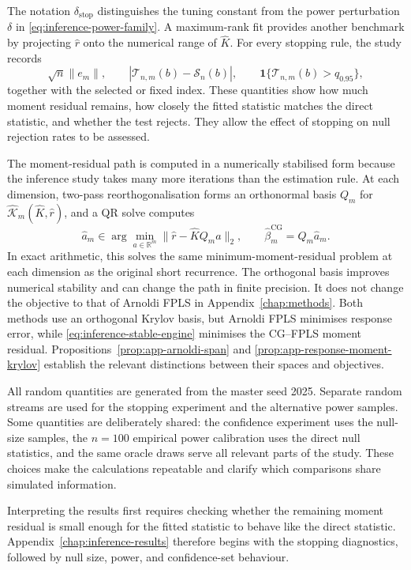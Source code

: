 The notation $\delta_{\mathrm{stop}}$ distinguishes the tuning constant from
the power perturbation $\delta$ in \eqref{eq:inference-power-family}.  A
maximum-rank fit provides another benchmark by projecting $\widehat r$ onto
the numerical range of $\widehat K$.  For every stopping rule, the study
records
\begin{equation}
    \sqrt n\|e_m\|,
    \qquad
    |\mathcal T_{n,m}(b)-\mathcal S_n(b)|,
    \qquad
    \mathbf 1\{\mathcal T_{n,m}(b)>q_{0.95}\},
    \label{eq:inference-stopping-diagnostics}
\end{equation}
together with the selected or fixed index.  These quantities show how much
moment residual remains, how closely the fitted statistic matches the direct
statistic, and whether the test rejects.  They allow the effect of stopping
on null rejection rates to be assessed.

The moment-residual path is computed in a numerically stabilised form because
the inference study takes many more iterations than the estimation rule.
At each dimension, two-pass reorthogonalisation forms an orthonormal basis
$Q_m$ for $\widehat{\mathcal K}_m(\widehat K,\widehat r)$, and a QR solve
computes
\begin{equation}
    \widehat a_m
    \in\arg\min_{a\in\mathbb R^m}
       \|\widehat r-\widehat KQ_ma\|_2,
    \qquad
    \widehat\beta_m^{\mathrm{CG}}=Q_m\widehat a_m.
    \label{eq:inference-stable-engine}
\end{equation}
In exact arithmetic, this solves the same minimum-moment-residual problem at
each dimension as the original short recurrence.  The orthogonal basis
improves numerical stability and can change the path in finite precision.
It does not change the objective to that of Arnoldi FPLS in
Appendix~\ref{chap:methods}.  Both methods use an orthogonal Krylov basis, but
Arnoldi FPLS minimises response error, while
\eqref{eq:inference-stable-engine} minimises the CG--FPLS moment residual.
Propositions~\ref{prop:app-arnoldi-span} and
\ref{prop:app-response-moment-krylov} establish the relevant distinctions
between their spaces and objectives.

All random quantities are generated from the master seed 2025.  Separate
random streams are used for the stopping experiment and the alternative
power samples.  Some quantities are deliberately shared: the confidence
experiment uses the null-size samples, the $n=100$ empirical power
calibration uses the direct null statistics, and the same oracle draws serve
all relevant parts of the study.  These choices make the calculations
repeatable and clarify which comparisons share simulated information.

Interpreting the results first requires checking whether the remaining
moment residual is small enough for the fitted statistic to behave like the
direct statistic.  Appendix~\ref{chap:inference-results} therefore begins
with the stopping diagnostics, followed by null size, power, and
confidence-set behaviour.
